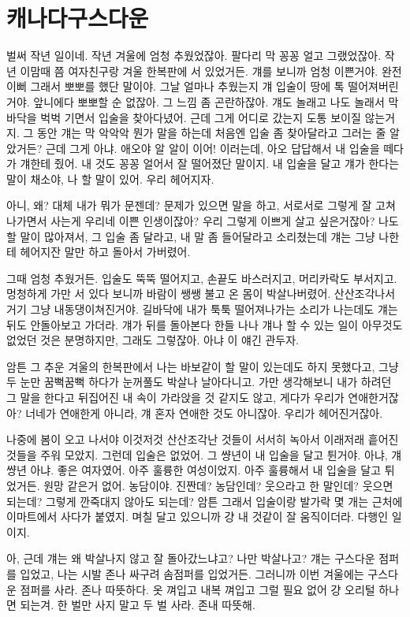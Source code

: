 \hypertarget{uxce90uxb098uxb2e4uxad6cuxc2a4uxb2e4uxc6b4}{%

\chapter{캐나다구스다운}\label{uxce90uxb098uxb2e4uxad6cuxc2a4uxb2e4uxc6b4}}



벌써 작년 일이네. 작년 겨울에 엄청 추웠었잖아. 팔다리 막 꽁꽁 얼고 그랬었잖아. 작년 이맘때 쯤 여자친구랑 겨울 한복판에 서 있었거든. 걔를 보니까 엄청 이쁜거야. 완전 이뻐 그래서 뽀뽀를 했단 말이야. 그날 얼마나 추웠는지 걔 입술이 땅에 톡 떨어져버린거야. 앞니에다 뽀뽀할 순 없잖아. 그 느낌 좀 곤란하잖아. 걔도 놀래고 나도 놀래서 막 바닥을 벅벅 기면서 입술을 찾아다녔어. 근데 그게 어디로 갔는지 도통 보이질 않는거지. 그 동안 걔는 막 악악악 뭔가 말을 하는데 처음엔 입술 좀 찾아달라고 그러는 줄 알았거든? 근데 그게 아냐. 애오야 알 알이 이어! 이러는데, 아오 답답해서 내 입술을 떼다가 걔한테 줬어. 내 것도 꽁꽁 얼어서 잘 떨어졌단 말이지. 내 입술을 달고 걔가 한다는 말이 채소야, 나 할 말이 있어. 우리 헤어지자.



아니, 왜? 대체 내가 뭐가 문젠데? 문제가 있으면 말을 하고, 서로서로 그렇게 잘 고쳐나가면서 사는게 우리네 이쁜 인생이잖아? 우리 그렇게 이쁘게 살고 싶은거잖아? 나도 할 말이 많아져서, 그 입술 좀 달라고, 내 말 좀 들어달라고 소리쳤는데 걔는 그냥 나한테 헤어지잔 말만 하고 돌아서 가버렸어.



그때 엄청 추웠거든. 입술도 뚝뚝 떨어지고, 손끝도 바스러지고, 머리카락도 부서지고. 멍청하게 가만 서 있다 보니까 바람이 쌩쌩 불고 온 몸이 박살나버렸어. 산산조각나서 거기 그냥 내동댕이쳐진거야. 길바닥에 내가 툭툭 떨어져나가는 소리가 나는데도 걔는 뒤도 안돌아보고 가더라. 걔가 뒤를 돌아본다 한들 나나 걔나 할 수 있는 일이 아무것도 없었던 것은 분명하지만, 그래도 그렇잖아. 아냐 이 얘긴 관두자.



암튼 그 추운 겨울의 한복판에서 나는 바보같이 할 말이 있는데도 하지 못했다고, 그냥 두 눈만 꿈뻑꿈뻑 하다가 눈꺼풀도 박살나 날아다니고. 가만 생각해보니 내가 하려던 그 말을 한다고 뒤집어진 내 속이 가라앉을 것 같지도 않고, 게다가 우리가 연애한거잖아? 너네가 연애한게 아니라, 걔 혼자 연애한 것도 아니잖아. 우리가 헤어진거잖아.



나중에 봄이 오고 나서야 이것저것 산산조각난 것들이 서서히 녹아서 이래저래 흩어진 것들을 주워 모았지. 그런데 입술은 없었어. 그 썅년이 내 입술을 달고 튄거야. 아냐, 걔 썅년 아냐. 좋은 여자였어. 아주 훌륭한 여성이었지. 아주 훌륭해서 내 입술을 달고 튀었거든. 원망 같은거 없어. 농담이야. 진짠데? 농담인데? 웃으라고 한 말인데? 웃으면 되는데? 그렇게 깐죽대지 않아도 되는데? 암튼 그래서 입술이랑 발가락 몇 개는 근처에 이마트에서 사다가 붙였지. 며칠 달고 있으니까 걍 내 것같이 잘 움직이더라. 다행인 일이지.



아, 근데 걔는 왜 박살나지 않고 잘 돌아갔느냐고? 나만 박살나고? 걔는 구스다운 점퍼를 입었고, 나는 시발 존나 싸구려 솜점퍼를 입었거든. 그러니까 이번 겨울에는 구스다운 점퍼를 사라. 존나 따뜻하다. 옷 껴입고 내복 껴입고 그럴 필요 없어 걍 오리털 하나면 되는겨. 한 벌만 사지 말고 두 벌 사라. 존내 따뜻해.

